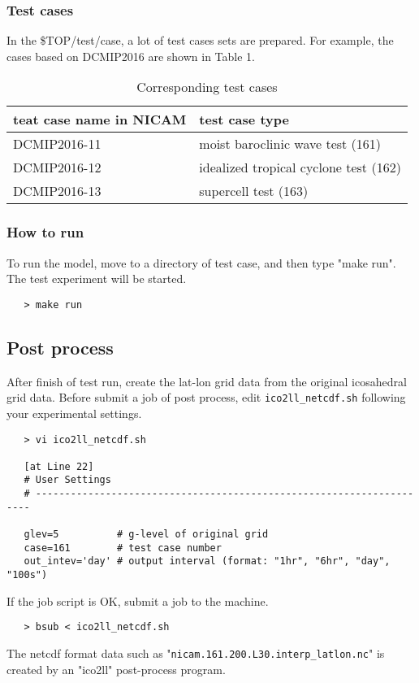 \subsubsection{Test cases}

\noindent In the \${TOP}/test/case, a lot of test cases sets are prepared.
For example, the cases based on DCMIP2016 are shown in Table 1.

 \begin{table}[b]
 \begin{center}
 \caption{Corresponding test cases}
 \begin{tabularx}{150mm}{|l|X|} \hline
 \rowcolor[gray]{0.9} teat case name in NICAM & test case type \\ \hline
  DCMIP2016-11 & moist baroclinic wave test (161)       \\ \hline
  DCMIP2016-12 & idealized tropical cyclone test (162)  \\ \hline
  DCMIP2016-13 & supercell test (163)                   \\ \hline
 \end{tabularx}
 \end{center}
 \end{table}


\subsubsection{How to run}

To run the model,
move to a directory of test case, and then type "make run".
The test experiment will be started.

 \begin{verbatim}
   > make run
 \end{verbatim}



\subsection{Post process}
 After finish of test run, create the lat-lon grid data from
 the original icosahedral grid data.
 Before submit a job of post process, edit \verb|ico2ll_netcdf.sh|
 following your experimental settings.
 \begin{verbatim}
   > vi ico2ll_netcdf.sh

   [at Line 22]
   # User Settings
   # ---------------------------------------------------------------------

   glev=5          # g-level of original grid
   case=161        # test case number
   out_intev='day' # output interval (format: "1hr", "6hr", "day", "100s")
 \end{verbatim}

 \noindent If the job script is OK, submit a job to the machine.
 \begin{verbatim}
   > bsub < ico2ll_netcdf.sh
 \end{verbatim}

 \noindent The netcdf format data such as "\verb|nicam.161.200.L30.interp_latlon.nc|"
 is created by an "ico2ll" post-process program.


